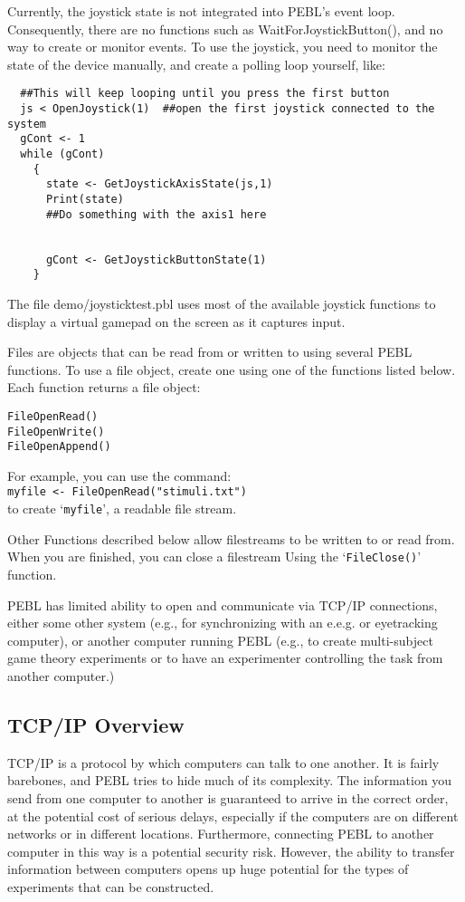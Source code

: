 Currently, the joystick state is not integrated into PEBL's event loop.  Consequently, there are no functions such as WaitForJoystickButton(), and no way to create or monitor events.  To use the joystick, you need to monitor the state of the device manually, and create a polling loop yourself, like:


\begin{verbatim}
  ##This will keep looping until you press the first button
  js < OpenJoystick(1)  ##open the first joystick connected to the system  
  gCont <- 1
  while (gCont)
    {
      state <- GetJoystickAxisState(js,1)
      Print(state)
      ##Do something with the axis1 here
      
      
      gCont <- GetJoystickButtonState(1)
    }
\end{verbatim}


The file demo/joysticktest.pbl uses most of the available joystick functions to display a virtual gamepad on the screen as it captures input.


Files are objects that can be read from or written to using several PEBL functions. To use a file object, create one using one of the functions 
listed below.  Each function returns a file object:
\begin{verbatim}
FileOpenRead()
FileOpenWrite()
FileOpenAppend()
\end{verbatim}

For example, you can use the command:\\
 \texttt{myfile <-  FileOpenRead("stimuli.txt")} \\
to create `\texttt{myfile}', a readable
file stream.


Other Functions described below allow filestreams to be written to 
or read from.  When you are finished, you can close a filestream 
Using the `\texttt{FileClose()}' function.



PEBL has limited ability to open and communicate via  TCP/IP
connections, either some other system (e.g., for synchronizing with an
e.e.g. or eyetracking computer), or another computer running PEBL
(e.g., to create multi-subject game theory experiments or to have an
experimenter controlling the task from another computer.)

\subsection{TCP/IP Overview}
TCP/IP is a protocol by which computers can talk to one another.  It
is fairly barebones, and PEBL tries to hide much of its
complexity. The information you send from one computer to another is
guaranteed to arrive in the correct order, at the potential cost of
serious delays, especially if the computers are on different networks
or in different locations.  Furthermore, connecting PEBL to another
computer in this way is a potential security risk. However, the
ability to transfer information between computers opens up huge
potential for the types of experiments that can be constructed.

